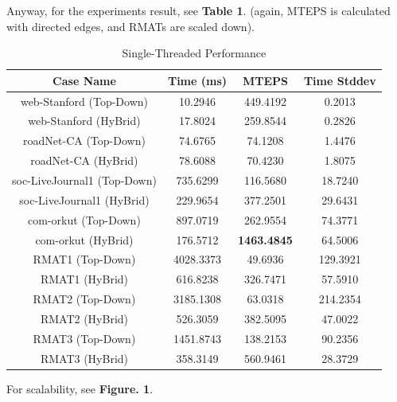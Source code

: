 \documentclass[12pt]{article}
\begin{document}
Anyway, for the experiments result, see \textbf{Table 1}. (again, MTEPS is calculated with directed edges, and RMATs are scaled down).
\begin{table}[!ht]
	\centering
	\begin{tabular}{ c | c | c | c }
		\textbf{Case Name}          & \textbf{Time (ms)} & \textbf{MTEPS}     & \textbf{Time Stddev} \\
		\hline \hline
		web-Stanford (Top-Down)     & 10.2946            & 449.4192           & 0.2013               \\
		web-Stanford (HyBrid)       & 17.8024            & 259.8544           & 0.2826               \\
		\hline
		roadNet-CA (Top-Down)       & 74.6765            & 74.1208            & 1.4476               \\
		roadNet-CA (HyBrid)         & 78.6088            & 70.4230            & 1.8075               \\
		\hline
		soc-LiveJournal1 (Top-Down) & 735.6299           & 116.5680           & 18.7240              \\
		soc-LiveJournal1 (HyBrid)   & 229.9654           & 377.2501           & 29.6431              \\
		\hline
		com-orkut (Top-Down)        & 897.0719           & 262.9554           & 74.3771              \\
		com-orkut (HyBrid)          & 176.5712           & \textbf{1463.4845} & 64.5006              \\
		\hline
		RMAT1 (Top-Down)            & 4028.3373          & 49.6936            & 129.3921             \\
		RMAT1 (HyBrid)              & 616.8238           & 326.7471           & 57.5910              \\
		\hline
		RMAT2 (Top-Down)            & 3185.1308          & 63.0318            & 214.2354             \\
		RMAT2 (HyBrid)              & 526.3059           & 382.5095           & 47.0022              \\
		\hline
		RMAT3 (Top-Down)            & 1451.8743          & 138.2153           & 90.2356              \\
		RMAT3 (HyBrid)              & 358.3149           & 560.9461           & 28.3729
	\end{tabular}
	\caption{Single-Threaded Performance}
\end{table}

For scalability, see \textbf{Figure. 1}.
\end{document}
